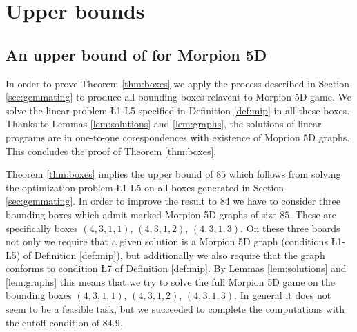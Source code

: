\section{Upper bounds}
\label{sec:upper}

  
\subsection{An upper bound of \therecord for Morpion 5D}
\label{subsec:84}

In order to prove Theorem \ref{thm:boxes} we apply the process described in Section \ref{sec:gemmating} to produce all bounding boxes relavent 
to Morpion 5D game. We solve the linear problem \L{1}-L{5} specified in Definition \ref{def:mip} in all these boxes. Thanks to 
Lemmas \ref{lem:solutions} and \ref{lem:graphs}, the solutions of linear programs are in one-to-one corespondences with existence of
Moprion 5D graphs. This concludes the proof of Theorem \ref{thm:boxes}.


Theorem \ref{thm:boxes} implies the upper bound of $85$ which follows from solving the optimization
problem \L{1}-L{5} on all boxes generated in Section \ref{sec:gemmating}. 
In order to improve the result to $84$ we have to consider three bounding boxes which admit marked Morpion 5D graphs of size $85$. These
are specifically boxes $(4,3,1,1)$, $(4,3,1,2)$, $(4,3,1,3)$.
On these three boards %
not only we require that a given solution is a 
Morpion 5D graph (conditions \L{1}-L{5}) of Definition \ref{def:mip}), but additionally we also require that the graph conforms to condition \L{7} of Definition \ref{def:mip}. 
By Lemmas \ref{lem:solutions} and \ref{lem:graphs} this means that we try to solve the full Morpion 5D game on the bounding boxes  $(4,3,1,1)$, $(4,3,1,2)$, $(4,3,1,3)$.
In general it does not seem to be a feasible task, but we succeeded to complete the computations with the cutoff condition of $84.9$.


